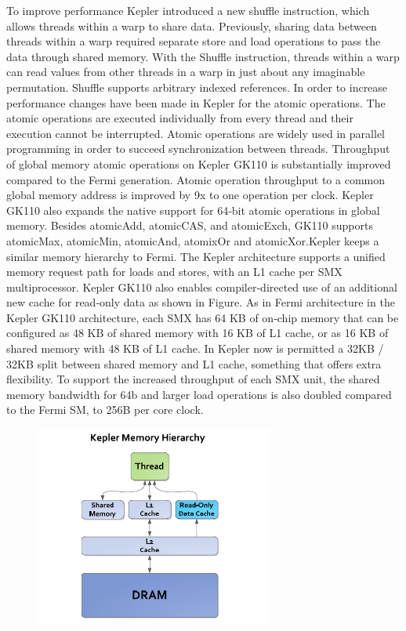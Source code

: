 To improve performance Kepler introduced a new shuffle instruction, which allows threads within a warp to share data. Previously, sharing data between threads within a warp required separate store and load operations to pass the data through shared memory. With the Shuffle instruction, threads within a warp can read values from other threads in a warp in just about any imaginable permutation. Shuffle supports arbitrary indexed references. In order to increase performance changes have been made in Kepler for the atomic operations. The atomic operations are executed individually from every thread and their execution cannot be interrupted. Atomic operations are widely used in parallel programming in order to succeed synchronization between threads. Throughput of global memory atomic operations on Kepler GK110 is substantially improved compared to the Fermi generation. Atomic operation throughput to a common global memory address is improved by 9x to one operation per clock. Kepler GK110 also expands the native support for 64‐bit atomic operations in global memory. Besides atomicAdd, atomicCAS, and atomicExch, GK110 supports atomicMax, atomicMin, atomicAnd, atomixOr and atomicXor.Kepler keeps a similar memory hierarchy to Fermi. The Kepler architecture supports a unified memory request path for loads and stores, with an L1 cache per SMX multiprocessor. Kepler GK110 also enables compiler‐directed use of an additional new cache for read‐only data as shown in Figure. As in Fermi architecture in the Kepler GK110 architecture, each SMX has 64 KB of on‐chip memory that can be configured as 48 KB of shared memory with 16 KB of L1 cache, or as 16 KB of shared memory with 48 KB of L1 cache. In Kepler now is permitted a 32KB / 32KB split between shared memory and L1 cache, something that offers extra flexibility. To support the increased throughput of each SMX unit, the shared memory bandwidth for 64b and larger load operations is also doubled compared to the Fermi SM, to 256B per core clock.

 \begin{figure}[H]
    \centering
        \includegraphics[totalheight=0.5\textheight,width=0.7\textwidth]{memory_hieranchy.png}
    \caption{}
    \label{fig:warp_scheduler}
\end{figure}

